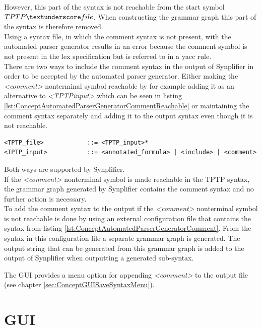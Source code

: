 However, this part of the syntax is not reachable from the start symbol $TPTP\textunderscore file$.
When constructing the grammar graph this part of the syntax is therefore removed.\\
Using a syntax file, in which the comment syntax is not present, with the automated parser generator results in an error because the comment symbol is not present in the lex specification but is referred to in a yacc rule.\\
There are two ways to include the comment syntax in the output of \ac{Synplifier} in order to be accepted by the automated parser generator.
Either making the \textit{<comment>} nonterminal symbol reachable by for example adding it as an alternative to \textit{<TPTP\textunderscore input>} which can be seen in listing \ref{lst:ConceptAutomatedParserGeneratorCommentReachable} or maintaining the comment syntax separately and adding it to the output syntax even though it is not reachable.
\begin{lstlisting}[language=none, basicstyle=\scriptsize, caption=Making the comment syntax reachable, label= lst:ConceptAutomatedParserGeneratorCommentReachable]
<TPTP_file>            ::= <TPTP_input>*
<TPTP_input>           ::= <annotated_formula> | <include> | <comment>
\end{lstlisting}

Both ways are supported by \ac{Synplifier}.\\
If the \textit{<comment>} nonterminal symbol is made reachable in the \ac{TPTP} syntax, the grammar graph generated by \ac{Synplifier} contains the comment syntax and no further action is necessary.\\
To add the comment syntax to the output if the \textit{<comment>} nonterminal symbol is not reachable is done by using an external configuration file that contains the syntax from listing \ref{lst:ConceptAutomatedParserGeneratorComment}.
From the syntax in this configuration file a separate grammar graph is generated. The output string that can be generated from this grammar graph is added to the output of \ac{Synplifier} when outputting a generated sub-syntax.

The GUI provides a menu option for appending \textit{<comment>} to the output file (see chapter \ref{sec:ConceptGUISaveSyntaxMenu}).

\section{GUI}\label{sec:ConceptGUI}

